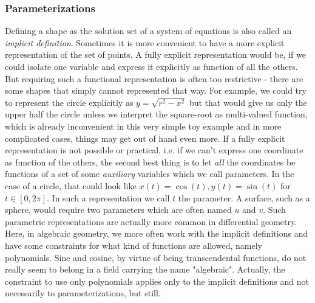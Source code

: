 

\subsubsection{Parameterizations}
Defining a shape as the solution set of a system of equations is also called an \emph{implicit definition}. Sometimes it is more convenient to have a more explicit representation of the set of points. A fully explicit representation would be, if we could isolate one variable and express it explicitly as function of all the others. But requiring such a functional representation is often too restrictive - there are some shapes that simply cannot represented that way. For example, we could try to represent the circle explicitly as $y = \sqrt{r^2 - x^2}$ but that would give us only the upper half the circle unless we interpret the square-root as multi-valued function, which is already inconvenient in this very simple toy example and in more complicated cases, things may get out of hand even more. If a fully explicit representation is not possible or practical, i.e. if we can't express one coordinate as function of the others, the second best thing is to let \emph{all} the coordinates be functions of a set of some \emph{auxiliary} variables which we call parameters. In the case of a circle, that could look like $x(t) = \cos(t), y(t) = \sin(t)$ for $t \in [0, 2 \pi]$. In such a representation we call $t$ the parameter. A surface, such as a sphere, would require two parameters which are often named $u$ and $v$. Such parametric representations are actually more common in differential geometry. Here, in algebraic geometry, we more often work with the implicit definitions and have some constraints for what kind of functions are allowed, namely polynomials. Sine and cosine, by virtue of being transcendental functions, do not really seem to belong in a field carrying the name "algebraic". Actually, the constraint to use only polynomials applies only to the implicit definitions and not necessarily to parameterizations, but still.


